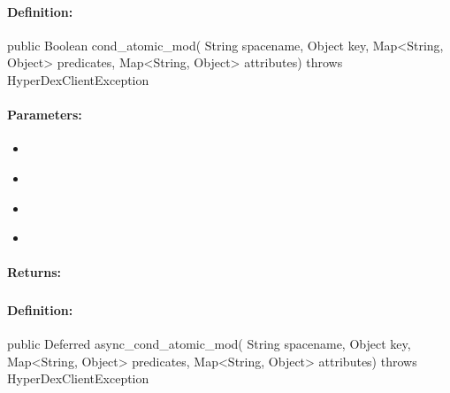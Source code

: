 \paragraph{Definition:}
\begin{javacode}
public Boolean cond_atomic_mod(
        String spacename,
        Object key,
        Map<String, Object> predicates,
        Map<String, Object> attributes) throws HyperDexClientException
\end{javacode}

\paragraph{Parameters:}
\begin{itemize}[noitemsep]
\item {}\\

\item {}\\

\item {}\\

\item {}\\

\end{itemize}

\paragraph{Returns:}


\pagebreak
\subsubsection{}
\label{api:java:async_cond_atomic_mod}


\paragraph{Definition:}
\begin{javacode}
public Deferred async_cond_atomic_mod(
        String spacename,
        Object key,
        Map<String, Object> predicates,
        Map<String, Object> attributes) throws HyperDexClientException
\end{javacode}

